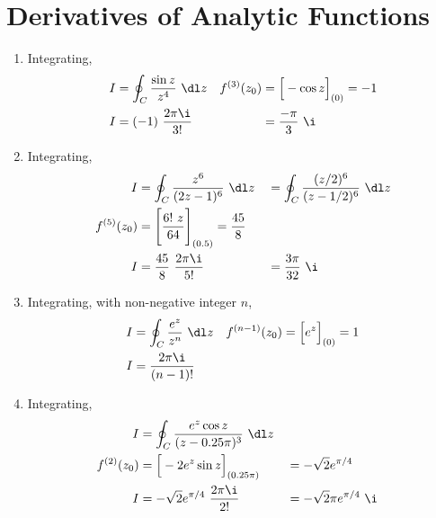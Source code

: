 \section{Derivatives of Analytic Functions}

\begin{enumerate}
    \item Integrating,
          \begin{align}
              I            & = \oint_C \frac{\sin z }{z^4}\ \dl z &
              f^{(3)}(z_0) & = \Big[-\cos z\Big]_{(0)} = -1         \\
              I            & = (-1)\ \frac{2\pi\i}{3!}            &
                           & = \frac{-\pi}{3}\ \i
          \end{align}

    \item Integrating,
          \begin{align}
              I            & = \oint_C \frac{z^6}{(2z - 1)^6}\ \dl z                 &
                           & = \oint_C \frac{(z/2)^6}{(z-1/2)^6}\ \dl z                \\
              f^{(5)}(z_0) & = \Bigg[ \frac{6!\ z}{64} \Bigg]_{(0.5)} = \frac{45}{8}   \\
              I            & = \frac{45}{8}\ \frac{2\pi\i}{5!}                       &
                           & = \frac{3\pi}{32}\ \i
          \end{align}

    \item Integrating, with non-negative integer $ n $,
          \begin{align}
              I              & = \oint_C \frac{e^z}{z^n}\ \dl z &
              f^{(n-1)}(z_0) & = \Big[ e^z \Big]_{(0)} = 1        \\
              I              & = \frac{2\pi\i}{(n-1)!}
          \end{align}

    \item Integrating,
          \begin{align}
              I            & = \oint_C \frac{e^z \cos z}{(z - 0.25\pi)^3}\ \dl z   \\
              f^{(2)}(z_0) & = \Big[ -2e^z \sin z \Big]_{(0.25\pi)}              &
                           & = -\sqrt{2} e^{\pi/4}                                 \\
              I            & = -\sqrt{2}e^{\pi/4}\ \frac{2\pi\i}{2!}             &
                           & = -\sqrt{2}\pi e^{\pi/4}\ \i
          \end{align}


\end{enumerate}
